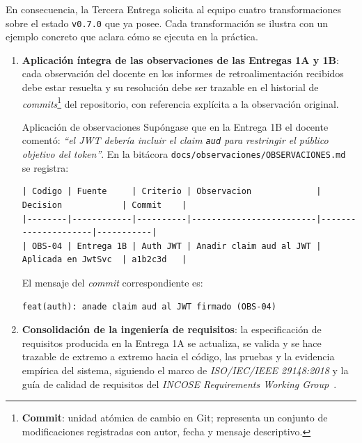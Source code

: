 \documentclass[11pt,a4paper]{article}
\begin{document}
En consecuencia, la Tercera Entrega solicita al equipo cuatro transformaciones sobre el estado \texttt{v0.7.0} que ya posee. Cada transformaci\'{o}n se ilustra con un ejemplo concreto que aclara c\'{o}mo se ejecuta en la pr\'{a}ctica.

\begin{enumerate}
    \item \textbf{Aplicaci\'{o}n \'{i}ntegra de las observaciones de las Entregas 1A y 1B}: cada observaci\'{o}n del docente en los informes de retroalimentaci\'{o}n recibidos debe estar resuelta y su resoluci\'{o}n debe ser trazable en el historial de \emph{commits}\footnote{\textbf{Commit}: unidad at\'{o}mica de cambio en Git; representa un conjunto de modificaciones registradas con autor, fecha y mensaje descriptivo.} del repositorio, con referencia expl\'{i}cita a la observaci\'{o}n original.

    \begin{cajaejemplo}{Aplicaci\'{o}n de observaciones}
        Sup\'{o}ngase que en la Entrega 1B el docente coment\'{o}: \emph{``el JWT deber\'{i}a incluir el claim \texttt{aud} para restringir el p\'{u}blico objetivo del token''}. En la bit\'{a}cora \texttt{docs/observaciones/OBSERVACIONES.md} se registra:

        \begin{lstlisting}[basicstyle=\ttfamily\scriptsize]
| Codigo | Fuente     | Criterio | Observacion             | Decision            | Commit    |
|--------|------------|----------|-------------------------|---------------------|-----------|
| OBS-04 | Entrega 1B | Auth JWT | Anadir claim aud al JWT | Aplicada en JwtSvc  | a1b2c3d   |
        \end{lstlisting}

        El mensaje del \emph{commit} correspondiente es:
        \begin{lstlisting}[basicstyle=\ttfamily\scriptsize]
feat(auth): anade claim aud al JWT firmado (OBS-04)
        \end{lstlisting}
    \end{cajaejemplo}

    \item \textbf{Consolidaci\'{o}n de la ingenier\'{i}a de requisitos}: la especificaci\'{o}n de requisitos producida en la Entrega 1A se actualiza, se valida y se hace trazable de extremo a extremo hacia el c\'{o}digo, las pruebas y la evidencia emp\'{i}rica del sistema, siguiendo el marco de \emph{ISO/IEC/IEEE 29148:2018} y la gu\'{i}a de calidad de requisitos del \emph{INCOSE Requirements Working Group}~\cite{iso29148,incose2023requirements,pohl2010requirements}.


\end{enumerate}
\end{document}
